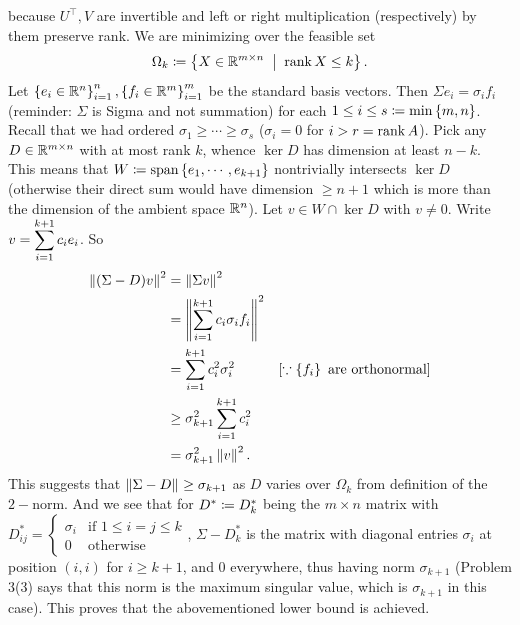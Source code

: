 \begin{enumerate}[leftmargin=*]
because $U^\top, V$ are invertible and left or right multiplication (respectively) by them preserve rank. We are minimizing over the feasible set $$\Omega_k \sett \set{X\in \R^{m\times n}\st \rk X \leq k}.$$ Let $\left\{e_i\in\mathbb{R}^n\right\}_{i=1}^n, \left\{f_i\in\mathbb{R}^m\right\}_{i=1}^m$ be the standard basis vectors. Then $\Sigma e_i = \sigma_if_i$ (reminder: $\Sigma$ is Sigma and not summation) for each $ 1\leq i\leq s\coloneqq\min\left\{m,n\right\}$. Recall that we had ordered $\sigma_1\geq \cdots\geq \sigma_s$ ($\sigma_{i}=0$ for $i>r=\operatorname{rank} A$). Pick any $D\in\mathbb{R}^{m\times n}$ with at most rank $k$, whence $\ker D$ has dimension at least $n-k$. This means that $W\coloneqq \text{span}\left\{e_1,\cdots,e_{k+1}\right\}$ nontrivially intersects $\ker D$ (otherwise their direct sum would have dimension $\geq n+1$ which is more than the dimension of the ambient space $\mathbb{R}^n$). Let $v\in W\cap\ker D$ with $v\neq 0$. Write $\displaystyle v=\sum_{i=1}^{k+1}c_i e_i$. So \begin{align*}
\left\lVert (\Sigma-D)v \right\rVert_{}^2 &= \left\lVert \Sigma v \right\rVert_{}^2 \\
&= \left\lVert \sum_{i=1}^{k+1}c_i\sigma_i f_i \right\rVert_{}^2 \\
&= \sum_{i=1}^{k+1}c_i^2\sigma_i^2 & [\because \left\{f_i\right\} \text{ are orthonormal}]\\
&\geq \sigma_{k+1}^2 \sum_{i=1}^{k+1}c_i^2\\&=\sigma_{k+1}^2\left\lVert v \right\rVert_{}^2.
\end{align*}
This suggests that $\left\lVert \Sigma-D \right\rVert_{}\geq \sigma_{k+1}$ as $D$ varies over $\Omega_k$ from definition of the $2-$norm. And we see that for $D^{*}\coloneqq D_k^*$ being the $m\times n$ matrix with $D^{*}_{ij}=\begin{cases} \sigma_i&\text{if } 1\leq i=j\leq k\\0&\text{otherwise}
\end{cases}$, $\Sigma-D_k^*$ is the matrix with diagonal entries $\sigma_i$ at position $(i,i)$ for $i\geq k+1$, and $0$ everywhere, thus having  norm $\sigma_{k+1}$ (Problem 3(3) says that this norm is the maximum singular value, which is $\sigma_{k+1}$ in this case). This proves that the abovementioned lower bound is achieved.


\end{enumerate}

